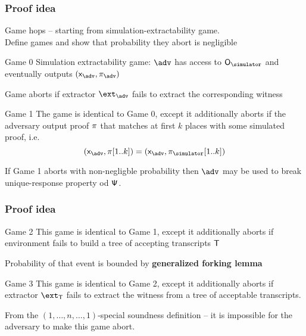 \documentclass[aspectratio=169]{beamer}
\renewcommand{\emph}[1]{\textbf{#1}}
\begin{document}
\begin{frame}
  \frametitle{Proof idea}
  Game hops -- starting from simulation-extractability game.\\
  Define games and show that probability they abort is negligible\pause

\begin{block}{Game 0}
  Simulation extractability game: $\adv$ has access to $\oracles$ and eventually
  outputs $(\inpa, \zkproofa)$

  Game aborts if extractor $\ext_\adv$ fails to extract the corresponding witness
\end{block}\pause

\begin{block}{Game 1}
  The game is identical to Game 0, except it additionally aborts if the
  adversary output proof $\pi$ that matches at first $k$ places with some
  simulated proof, i.e.
  \[
    (\inpa, \zkproof[1..k]) = (\inpa, \zkproofs[1..k])
  \]

  If Game 1 aborts with non-negligble probability then $\adv$ may be used to
  break unique-response property od ${\mathsf{\Psi}}$.
\end{block}
\end{frame}

\begin{frame}
  \frametitle{Proof idea}
\begin{block}{Game 2}
  This game is identical to Game 1, except it additionally aborts if environment
  fails to build a tree of accepting transcripts $\mathsf{T}$

  Probability of that event is bounded by \emph{generalized forking lemma}
\end{block}\pause

\begin{block}{Game 3}
  This game is identical to Game 2, except it additionally aborts if extractor
  $\ext_\tree$ fails to extract the witness from a tree of acceptable
  transcripts.

  From the $(1, \ldots, n, \ldots, 1)$-special soundness definition -- it is
  impossible for the adversary to make this game abort.
\end{block}

\end{frame}
\end{document}

